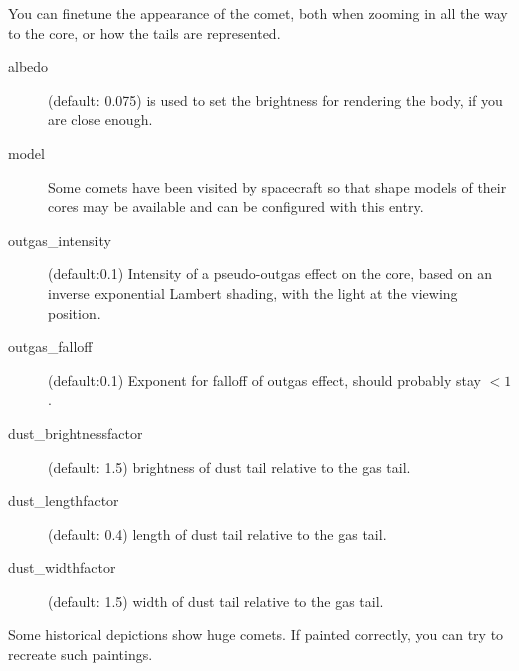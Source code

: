 You can finetune the appearance of the comet, both when zooming in all the way to the core, or how the tails are represented. 
\begin{description}
\item[albedo] (default: 0.075) is used to set the brightness for rendering the body, if you are close enough. 
\item[model] Some comets have been visited by spacecraft so that shape models of their cores 
	may be available and can be configured with this entry.
\item[outgas\_intensity] (default:0.1) Intensity of a pseudo-outgas effect on the core, based on an inverse exponential Lambert shading, with the light at the viewing position.
\item[outgas\_falloff] (default:0.1)  Exponent for falloff of outgas effect, should probably stay $< 1$.
\item[dust\_brightnessfactor] (default: 1.5) brightness of dust tail relative to the gas tail.
\item[dust\_lengthfactor] (default: 0.4) length of dust tail relative to the gas tail.
\item[dust\_widthfactor] (default: 1.5) width of dust tail relative to the gas tail.
\end{description}
Some historical depictions show huge comets. If painted correctly, you can try to recreate such paintings.

